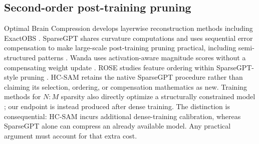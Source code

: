 \subsection{Second-order post-training pruning}
Optimal Brain Compression develops layerwise reconstruction methods including ExactOBS \cite{obc}. SparseGPT shares curvature computations and uses sequential error compensation to make large-scale post-training pruning practical, including semi-structured patterns \cite{sparsegpt}. Wanda uses activation-aware magnitude scores without a compensating weight update \cite{wanda}. ROSE studies feature ordering within SparseGPT-style pruning \cite{rose}. HC-SAM retains the native SparseGPT procedure rather than claiming its selection, ordering, or compensation mathematics as new. Training methods for $N{:}M$ sparsity also directly optimize a structurally constrained model \cite{nm}; our endpoint is instead produced after dense training. The distinction is consequential: HC-SAM incurs additional dense-training calibration, whereas SparseGPT alone can compress an already available model. Any practical argument must account for that extra cost.
